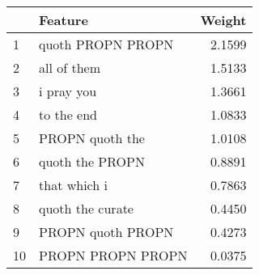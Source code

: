 \begin{tabular}{llr}
\toprule
{} &            Feature &  Weight \\
\midrule
1  &  quoth PROPN PROPN &  2.1599 \\
2  &        all of them &  1.5133 \\
3  &         i pray you &  1.3661 \\
4  &         to the end &  1.0833 \\
5  &    PROPN quoth the &  1.0108 \\
6  &    quoth the PROPN &  0.8891 \\
7  &       that which i &  0.7863 \\
8  &   quoth the curate &  0.4450 \\
9  &  PROPN quoth PROPN &  0.4273 \\
10 &  PROPN PROPN PROPN &  0.0375 \\
\bottomrule
\end{tabular}

